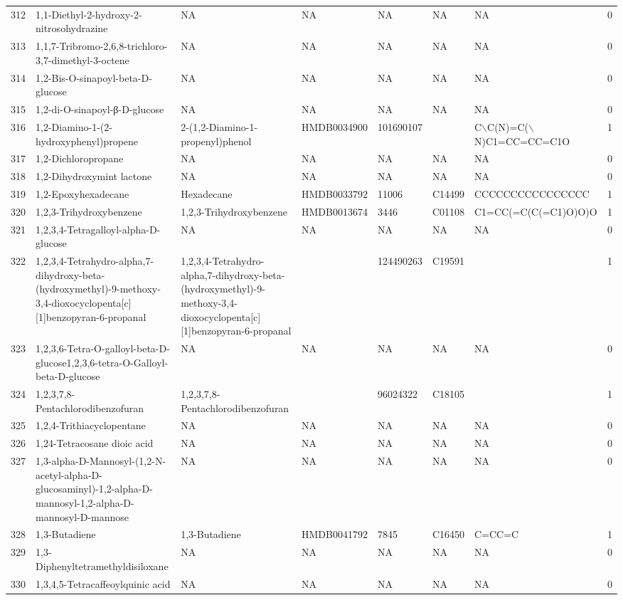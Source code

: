 \documentclass[a4paper]{article}
\begin{document}
\begin{longtable}{rlllllll}
  312 & 1,1-Diethyl-2-hydroxy-2-nitrosohydrazine & NA & NA & NA & NA & NA & 0 \\ 
  313 & 1,1,7-Tribromo-2,6,8-trichloro-3,7-dimethyl-3-octene & NA & NA & NA & NA & NA & 0 \\ 
  314 & 1,2-Bis-O-sinapoyl-beta-D-glucose & NA & NA & NA & NA & NA & 0 \\ 
  315 & 1,2-di-O-sinapoyl-β-D-glucose & NA & NA & NA & NA & NA & 0 \\ 
  316 & 1,2-Diamino-1-(2-hydroxyphenyl)propene & 2-(1,2-Diamino-1-propenyl)phenol & HMDB0034900 & 101690107 &  & C$\backslash$C(N)=C($\backslash$N)C1=CC=CC=C1O & 1 \\ 
  317 & 1,2-Dichloropropane & NA & NA & NA & NA & NA & 0 \\ 
  318 & 1,2-Dihydroxymint lactone & NA & NA & NA & NA & NA & 0 \\ 
  319 & 1,2-Epoxyhexadecane & Hexadecane & HMDB0033792 & 11006 & C14499 & CCCCCCCCCCCCCCCC & 1 \\ 
  320 & 1,2,3-Trihydroxybenzene & 1,2,3-Trihydroxybenzene & HMDB0013674 & 3446 & C01108 & C1=CC(=C(C(=C1)O)O)O & 1 \\ 
  321 & 1,2,3,4-Tetragalloyl-alpha-D-glucose & NA & NA & NA & NA & NA & 0 \\ 
  322 & 1,2,3,4-Tetrahydro-alpha,7-dihydroxy-beta-(hydroxymethyl)-9-methoxy-3,4-dioxocyclopenta[c][1]benzopyran-6-propanal & 1,2,3,4-Tetrahydro-alpha,7-dihydroxy-beta-(hydroxymethyl)-9-methoxy-3,4-dioxocyclopenta[c][1]benzopyran-6-propanal &  & 124490263 & C19591 &  & 1 \\ 
  323 & 1,2,3,6-Tetra-O-galloyl-beta-D-glucose1,2,3,6-tetra-O-Galloyl-beta-D-glucose & NA & NA & NA & NA & NA & 0 \\ 
  324 & 1,2,3,7,8-Pentachlorodibenzofuran & 1,2,3,7,8-Pentachlorodibenzofuran &  & 96024322 & C18105 &  & 1 \\ 
  325 & 1,2,4-Trithiacyclopentane & NA & NA & NA & NA & NA & 0 \\ 
  326 & 1,24-Tetracosane dioic acid & NA & NA & NA & NA & NA & 0 \\ 
  327 & 1,3-alpha-D-Mannosyl-(1,2-N-acetyl-alpha-D-glucosaminyl)-1,2-alpha-D-mannosyl-1,2-alpha-D-mannosyl-D-mannose & NA & NA & NA & NA & NA & 0 \\ 
  328 & 1,3-Butadiene & 1,3-Butadiene & HMDB0041792 & 7845 & C16450 & C=CC=C & 1 \\ 
  329 & 1,3-Diphenyltetramethyldisiloxane & NA & NA & NA & NA & NA & 0 \\ 
  330 & 1,3,4,5-Tetracaffeoylquinic acid & NA & NA & NA & NA & NA & 0 \\ 

\end{longtable}
\end{document}
